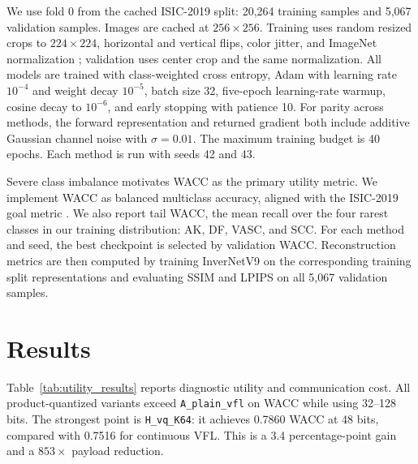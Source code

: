 \documentclass{article}
\begin{document}
We use fold 0 from the cached ISIC-2019 split: 20,264 training samples and 5,067 validation samples. Images are cached at $256 \times 256$. Training uses random resized crops to $224 \times 224$, horizontal and vertical flips, color jitter, and ImageNet normalization \citep{deng2009imagenet}; validation uses center crop and the same normalization. All models are trained with class-weighted cross entropy, Adam \citep{kingma2015adam} with learning rate $10^{-4}$ and weight decay $10^{-5}$, batch size 32, five-epoch learning-rate warmup, cosine decay to $10^{-6}$, and early stopping with patience 10. For parity across methods, the forward representation and returned gradient both include additive Gaussian channel noise with $\sigma=0.01$. The maximum training budget is 40 epochs. Each method is run with seeds 42 and 43.

Severe class imbalance motivates WACC as the primary utility metric. We implement WACC as balanced multiclass accuracy, aligned with the ISIC-2019 goal metric \citep{isic2019challenge}. We also report tail WACC, the mean recall over the four rarest classes in our training distribution: AK, DF, VASC, and SCC. For each method and seed, the best checkpoint is selected by validation WACC. Reconstruction metrics are then computed by training InverNetV9 on the corresponding training split representations and evaluating SSIM \citep{wang2004ssim} and LPIPS \citep{zhang2018lpips} on all 5,067 validation samples.

\section{Results}
Table~\ref{tab:utility_results} reports diagnostic utility and communication cost. All product-quantized variants exceed \texttt{A\_plain\_vfl} on WACC while using 32--128 bits. The strongest point is \texttt{H\_vq\_K64}: it achieves 0.7860 WACC at 48 bits, compared with 0.7516 for continuous VFL. This is a 3.4 percentage-point gain and a $853\times$ payload reduction.
\end{document}
